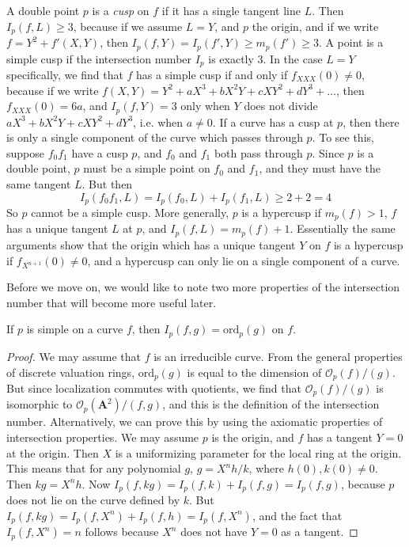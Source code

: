 \begin{example}
    A double point $p$ is a \emph{cusp} on $f$ if it has a single tangent line $L$. Then $I_p(f,L) \geq 3$, because if we assume $L = Y$, and $p$ the origin, and if we write $f = Y^2 + f'(X,Y)$, then $I_p(f,Y) = I_p(f',Y) \geq m_p(f') \geq 3$. A point is a simple cusp if the intersection number $I_p$ is exactly 3. In the case $L = Y$ specifically, we find that $f$ has a simple cusp if and only if $f_{XXX}(0) \neq 0$, because if we write $f(X,Y) = Y^2 + aX^3 + bX^2Y + cXY^2 + dY^3 + \dots$, then $f_{XXX}(0) = 6a$, and $I_p(f,Y) = 3$ only when $Y$ does not divide $aX^3 + bX^2Y + cXY^2 + dY^3$, i.e. when $a \neq 0$. If a curve has a cusp at $p$, then there is only a single component of the curve which passes through $p$. To see this, suppose $f_0f_1$ have a cusp $p$, and $f_0$ and $f_1$ both pass through $p$. Since $p$ is a double point, $p$ must be a simple point on $f_0$ and $f_1$, and they must have the same tangent $L$. But then
    \[ I_p(f_0f_1,L) = I_p(f_0,L) + I_p(f_1,L) \geq 2 + 2 = 4 \]
    So $p$ cannot be a simple cusp. More generally, $p$ is a hypercusp if $m_p(f) > 1$, $f$ has a unique tangent $L$ at $p$, and $I_p(f,L) = m_p(f) + 1$. Essentially the same arguments show that the origin which has a unique tangent $Y$ on $f$ is a hypercusp if $f_{X^{n+1}}(0) \neq 0$, and a hypercusp can only lie on a single component of a curve.
\end{example}

Before we move on, we would like to note two more properties of the intersection number that will become more useful later.

\begin{theorem}
    If $p$ is simple on a curve $f$, then $I_p(f,g) = \text{ord}_p(g)$ on $f$.
\end{theorem}
\begin{proof}
    We may assume that $f$ is an irreducible curve. From the general properties of discrete valuation rings, $\text{ord}_p(g)$ is equal to the dimension of $\mathcal{O}_p(f)/(g)$. But since localization commutes with quotients, we find that $\mathcal{O}_p(f)/(g)$ is isomorphic to $\mathcal{O}_p(\mathbf{A}^2)/(f,g)$, and this is the definition of the intersection number. Alternatively, we can prove this by using the axiomatic properties of intersection properties. We may assume $p$ is the origin, and $f$ has a tangent $Y = 0$ at the origin. Then $X$ is a uniformizing parameter for the local ring at the origin. This means that for any polynomial $g$, $g = X^nh/k$, where $h(0), k(0) \neq 0$. Then $kg = X^nh$. Now $I_p(f,kg) = I_p(f,k) + I_p(f,g) = I_p(f,g)$, because $p$ does not lie on the curve defined by $k$. But $I_p(f,kg) = I_p(f,X^n) + I_p(f,h) = I_p(f,X^n)$, and the fact that $I_p(f,X^n) = n$ follows because $X^n$ does not have $Y = 0$ as a tangent.
\end{proof}

